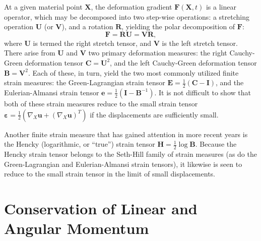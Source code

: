 At a given material point $\mathbf{X}$, the deformation gradient $\mathbf{F} (\mathbf{X}, t)$ is a linear operator, which may be decomposed into two step-wise operations: a stretching operation $\mathbf{U}$ (or $\mathbf{V}$), and a rotation $\mathbf{R}$, yielding the polar decomposition of $\mathbf{F}$:
\begin{equation}
  \mathbf{F} = \mathbf{R} \mathbf{U} = \mathbf{V} \mathbf{R},
\end{equation}
where $\mathbf{U}$ is termed the right stretch tensor, and $\mathbf{V}$ is the left stretch tensor. There arise from $\mathbf{U}$ and $\mathbf{V}$ two primary deformation measures: the right Cauchy-Green deformation tensor $\mathbf{C} = \mathbf{U}^2$, and the left Cauchy-Green deformation tensor $\mathbf{B} = \mathbf{V}^2$. Each of these, in turn, yield the two most commonly utilized finite strain measures: the Green-Lagrangian strain tensor $\mathbf{E} = \frac{1}{2} (\mathbf{C} - \mathbf{I})$, and the Eulerian-Almansi strain tensor $\mathbf{e} = \frac{1}{2} (\mathbf{I} - \mathbf{B}^{-1})$. It is not difficult to show that both of these strain measures reduce to the small strain tensor $\boldsymbol{\varepsilon} = \frac{1}{2} (\nabla_X \mathbf{u} + (\nabla_X \mathbf{u})^T)$ if the displacements are sufficiently small.

Another finite strain measure that has gained attention in more recent years is the Hencky (logarithmic, or ``true'') strain tensor $\mathbf{H} = \frac{1}{2} \log \mathbf{B}$. Because the Hencky strain tensor belongs to the Seth-Hill family of strain measures (as do the Green-Lagrangian and Eulerian-Almansi strain tensors), it likewise is seen to reduce to the small strain tensor in the limit of small displacements.

\section{Conservation of Linear and Angular Momentum}

